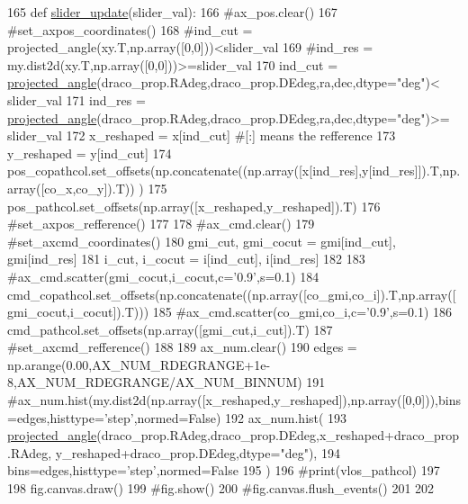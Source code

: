 \begin{DoxyCode}
165 \textcolor{keyword}{def }\hyperlink{namespaceplot__Draco__SDSS__CMD__CMcut_a9bc5b2b68855c01a286faea241fb5940}{slider\_update}(slider\_val):
166     \textcolor{comment}{#ax\_pos.clear()  }
167     \textcolor{comment}{#set\_axpos\_coordinates()}
168     \textcolor{comment}{#ind\_cut = projected\_angle(xy.T,np.array([0,0]))<slider\_val}
169     \textcolor{comment}{#ind\_res = my.dist2d(xy.T,np.array([0,0]))>=slider\_val}
170     ind\_cut = \hyperlink{namespacecoord_a04a9b47f67924315930327ed806ee648}{projected\_angle}(draco\_prop.RAdeg,draco\_prop.DEdeg,ra,dec,dtype=\textcolor{stringliteral}{"deg"})<
      slider\_val
171     ind\_res = \hyperlink{namespacecoord_a04a9b47f67924315930327ed806ee648}{projected\_angle}(draco\_prop.RAdeg,draco\_prop.DEdeg,ra,dec,dtype=\textcolor{stringliteral}{"deg"})>=
      slider\_val
172     x\_reshaped = x[ind\_cut] \textcolor{comment}{#[:] means the refference}
173     y\_reshaped = y[ind\_cut]
174     pos\_copathcol.set\_offsets(np.concatenate((np.array([x[ind\_res],y[ind\_res]]).T,np.array([co\_x,co\_y]).T))
      )
175     pos\_pathcol.set\_offsets(np.array([x\_reshaped,y\_reshaped]).T)   
176     \textcolor{comment}{#set\_axpos\_refference()}
177     
178     \textcolor{comment}{#ax\_cmd.clear()}
179     \textcolor{comment}{#set\_axcmd\_coordinates()}
180     gmi\_cut, gmi\_cocut = gmi[ind\_cut], gmi[ind\_res]
181     i\_cut, i\_cocut = i[ind\_cut], i[ind\_res]
182     
183     \textcolor{comment}{#ax\_cmd.scatter(gmi\_cocut,i\_cocut,c='0.9',s=0.1)}
184     cmd\_copathcol.set\_offsets(np.concatenate((np.array([co\_gmi,co\_i]).T,np.array([gmi\_cocut,i\_cocut]).T)))
185     \textcolor{comment}{#ax\_cmd.scatter(co\_gmi,co\_i,c='0.9',s=0.1)}
186     cmd\_pathcol.set\_offsets(np.array([gmi\_cut,i\_cut]).T)
187     \textcolor{comment}{#set\_axcmd\_refference()}
188 
189     ax\_num.clear()
190     edges = np.arange(0.00,AX\_NUM\_RDEGRANGE+1e-8,AX\_NUM\_RDEGRANGE/AX\_NUM\_BINNUM)
191     \textcolor{comment}{
      #ax\_num.hist(my.dist2d(np.array([x\_reshaped,y\_reshaped]),np.array([0,0])),bins=edges,histtype='step',normed=False)}
192     ax\_num.hist(
193         \hyperlink{namespacecoord_a04a9b47f67924315930327ed806ee648}{projected\_angle}(draco\_prop.RAdeg,draco\_prop.DEdeg,x\_reshaped+draco\_prop.RAdeg,
      y\_reshaped+draco\_prop.DEdeg,dtype=\textcolor{stringliteral}{"deg"}),
194         bins=edges,histtype=\textcolor{stringliteral}{'step'},normed=\textcolor{keyword}{False}
195     )
196     \textcolor{comment}{#print(vlos\_pathcol)}
197 
198     fig.canvas.draw()
199     \textcolor{comment}{#fig.show()}
200     \textcolor{comment}{#fig.canvas.flush\_events()}
201     
202 
\end{DoxyCode}
